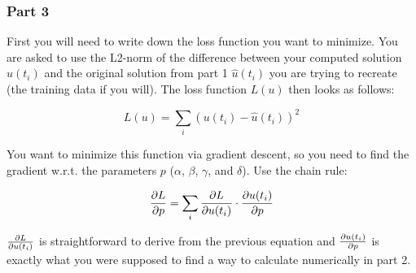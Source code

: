 \documentclass{article}
\begin{document}
\subsubsection{Part 3}

First you will need to write down the loss function you want to minimize. You are asked to use the L2-norm
of the difference between your computed solution $u(t_i)$ and the original solution from part 1 $\hat u(t_i)$ you are trying to 
recreate (the training data if you will). The loss function $L(u)$ then looks as follows:

$$
L(u) = \sum_i (u(t_i) - \hat u(t_i))^2
$$

You want to minimize this function via gradient descent, so you need to find the gradient w.r.t. the parameters
$p$ ($\alpha$, $\beta$, $\gamma$, and $\delta$). Use the chain rule:

$$
\pdv{L}{p} = \sum_i \pdv{L}{u(t_i)} \cdot \pdv{u(t_i)}{p}
$$

$\pdv{L}{u(t_i)}$ is straightforward to derive from the previous equation and $\pdv{u(t_i)}{p}$ is exactly what you were
supposed to find a way to calculate numerically in part 2.
\end{document}
